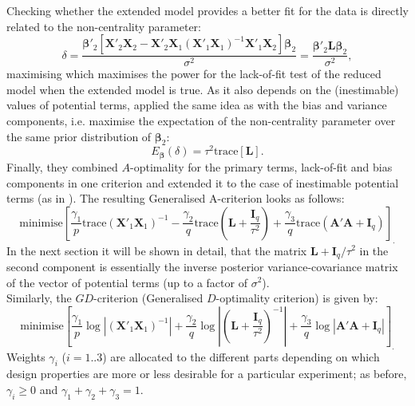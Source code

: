 Checking whether the extended model provides a better fit for the data is directly related to the non-centrality parameter:
\begin{equation}
\label{eq::delta}
\delta=\frac{\bm{\beta}'_{2}[\bm{X}'_{2}\bm{X}_2-\bm{X}'_{2}\bm{X}_1(\bm{X}'_{1}\bm{X}_1)^{-1}\bm{X}'_{1}\bm{X}_2]\bm{\beta}_2}{\sigma^2}=\frac{\bm{\beta}'_{2}\bm{L}\bm{\beta}_2}{\sigma^2},
\end{equation}
maximising which maximises the power for the lack-of-fit test of the reduced model when the extended model is true. As it also depends on the (inestimable) values of potential terms, \citet{Goos2005model} applied the same idea as with the bias and variance components, i.e. maximise the expectation of the non-centrality parameter over the same prior distribution of $\bm{\beta}_2$:
\begin{equation*}
E_{\bm{\beta}}(\delta)=\tau^{2}\mbox{trace}[\bm{L}].
\end{equation*}
Finally, they combined $A$-optimality for the primary terms, lack-of-fit and bias components in one criterion and extended it to the case of inestimable potential terms (as in \citealp{DuMouchel1994}). The resulting Generalised A-criterion looks as follows:
\begin{equation}
\label{eq::GA}
\mbox{minimise} \left[ \frac{\gamma_{1}}{p}\mbox{trace}(\bm{X}'_{1}\bm{X}_1)^{-1}-\frac{\gamma_{2}}{q}\mbox{trace}\left(\bm{L}+\frac{\bm{I}_{q}}{\tau^{2}}\right)+\frac{\gamma_{3}}{q}\mbox{trace}(\bm{A}'\bm{A}+\bm{I}_{q})\right]_{.}
\end{equation}
In the next section it will be shown in detail, that the matrix $\bm{L}+\bm{I}_{q}/\tau^{2}$ in the second component is essentially the inverse posterior variance-covariance matrix of the vector of potential terms (up to a factor of $\sigma^2$). \\
Similarly, the $GD$-criterion (Generalised $D$-optimality criterion) is given by:
\begin{equation}
\label{eq::GD}
\mbox{minimise} \left[ \frac{\gamma_{1}}{p}\log|(\bm{X}'_{1}\bm{X}_1)^{-1}|+\frac{\gamma_{2}}{q}\log\left|\left(\bm{L}+\frac{\bm{I}_{q}}{\tau^{2}}\right)^{-1}\right|+\frac{\gamma_{3}}{q}\log|\bm{A}'\bm{A}+\bm{I}_{q}|\right]_{.}
\end{equation}
Weights $\gamma_{i}$ ($i=1..3$) are allocated to the different parts depending on which design properties are more or less desirable for a particular experiment; as before, $\gamma_{i} \geq 0$ and $\gamma_1+\gamma_2+\gamma_3=1$. \\
